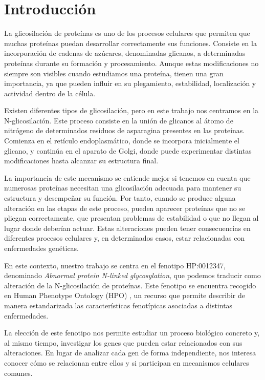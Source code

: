 \section{Introducción}

La glicosilación de proteínas es uno de los procesos celulares que permiten que muchas proteínas puedan desarrollar correctamente sus funciones. Consiste en la incorporación de cadenas de azúcares, denominadas glicanos, a determinadas proteínas durante su formación y procesamiento. Aunque estas modificaciones no siempre son visibles cuando estudiamos una proteína, tienen una gran importancia, ya que pueden influir en su plegamiento, estabilidad, localización y actividad dentro de la célula.

Existen diferentes tipos de glicosilación, pero en este trabajo nos centramos en la N-glicosilación. Este proceso consiste en la unión de glicanos al átomo de nitrógeno de determinados residuos de asparagina presentes en las proteínas. Comienza en el retículo endoplasmático, donde se incorpora inicialmente el glicano, y continúa en el aparato de Golgi, donde puede experimentar distintas modificaciones hasta alcanzar su estructura final.

La importancia de este mecanismo se entiende mejor si tenemos en cuenta que numerosas proteínas necesitan una glicosilación adecuada para mantener su estructura y desempeñar su función. Por tanto, cuando se produce alguna alteración en las etapas de este proceso, pueden aparecer proteínas que no se pliegan correctamente, que presentan problemas de estabilidad o que no llegan al lugar donde deberían actuar. Estas alteraciones pueden tener consecuencias en diferentes procesos celulares y, en determinados casos, estar relacionadas con enfermedades genéticas.

En este contexto, nuestro trabajo se centra en el fenotipo HP:0012347, denominado \textit{Abnormal protein N-linked glycosylation}, que podemos traducir como alteración de la N-glicosilación de proteínas. Este fenotipo se encuentra recogido en Human Phenotype Ontology (HPO) \cite{Kohler2021}, un recurso que permite describir de manera estandarizada las características fenotípicas asociadas a distintas enfermedades.

La elección de este fenotipo nos permite estudiar un proceso biológico concreto y, al mismo tiempo, investigar los genes que pueden estar relacionados con sus alteraciones. En lugar de analizar cada gen de forma independiente, nos interesa conocer cómo se relacionan entre ellos y si participan en mecanismos celulares comunes.

